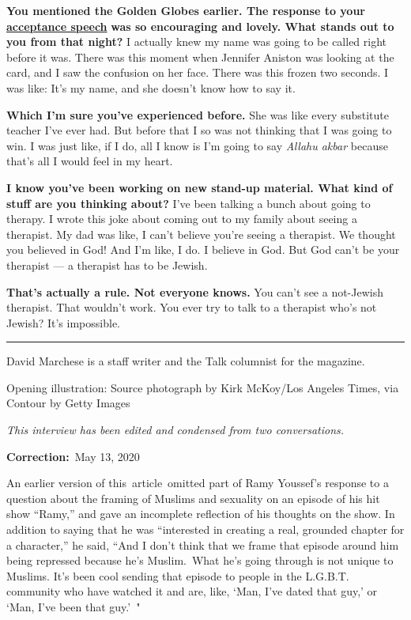 \textbf{You mentioned the Golden Globes earlier. The response to your}
\textbf{\href{http://nytimes3xbfgragh.onion\#tooltip-7}{acceptance
speech}} \textbf{was so encouraging and lovely. What stands out to you
from that night?} I actually knew my name was going to be called right
before it was. There was this moment when Jennifer Aniston was looking
at the card, and I saw the confusion on her face. There was this frozen
two seconds. I was like: It's my name, and she doesn't know how to say
it.

\textbf{Which I'm sure you've experienced before.} She was like every
substitute teacher I've ever had. But before that I so was not thinking
that I was going to win. I was just like, if I do, all I know is I'm
going to say \emph{Allahu akbar} because that's all I would feel in my
heart.

\textbf{I know you've been working on new stand-up material. What kind
of stuff are you thinking about?} I've been talking a bunch about going
to therapy. I wrote this joke about coming out to my family about seeing
a therapist. My dad was like, I can't believe you're seeing a therapist.
We thought you believed in God! And I'm like, I do. I believe in God.
But God can't be your therapist --- a therapist has to be Jewish.

\textbf{That's actually a rule. Not everyone knows.} You can't see a
not-Jewish therapist. That wouldn't work. You ever try to talk to a
therapist who's not Jewish? It's impossible.

\begin{center}\rule{0.5\linewidth}{\linethickness}\end{center}

David Marchese is a staff writer and the Talk columnist for the
magazine.

Opening illustration: Source photograph by Kirk McKoy/Los Angeles Times,
via Contour by Getty Images

\emph{This interview has been edited and condensed from two
conversations.}

\textbf{Correction:}~May 13, 2020

An earlier version of this~article~omitted part of Ramy Youssef's
response to a question about the framing of Muslims and sexuality on an
episode of his hit show ``Ramy,'' and gave an incomplete reflection of
his thoughts on the show. In addition to saying that he was ``interested
in creating a real, grounded chapter for a character,'' he said, ``And I
don't think that we frame that episode around him being repressed
because he's Muslim.~What he's going through is not unique to Muslims.
It's been cool sending that episode to people in the L.G.B.T. community
who have watched it and are, like, `Man, I've dated that guy,' or `Man,
I've been that guy.'~"

